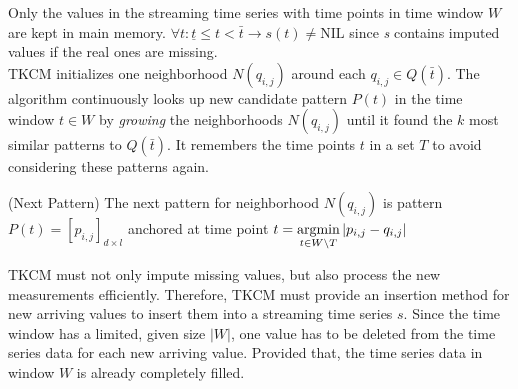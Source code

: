 \documentclass[abstracton,12pt,oneside]{scrreprt}
\begin{document}
Only the values in the streaming time series with time points in time window $W$ are kept in main memory. $\forall t: \underline{t} \leq t < \bar{t} \rightarrow s(t) \ne \text{NIL}$ since \emph{s} contains imputed values if the real ones are missing. \\
TKCM  initializes one neighborhood $N(q_{i,j})$ around each $q_{i,j} \in Q(\bar{t})$. The algorithm continuously looks up new candidate pattern $P(t)$ in the time window $t \in W$ by \emph{growing} the neighborhoods $N(q_{i,j})$ until it found the $k$ most similar patterns to $Q(\bar{t})$. It remembers the time points $t$ in a set $T$ to avoid considering these patterns again. 
\begin{defn}
		\label{def3}
	(Next Pattern) The next pattern for neighborhood $N(q_{i,j})$ is pattern $P(t) = [p_{i,j}]_{d\times l}$ anchored at time point $t = \argmin_{t \in W \setminus T} |p_{i,j}-q_{i,j}|$
\end{defn}
TKCM must not only impute missing values, but also process the new measurements efficiently. Therefore, TKCM must provide an insertion method for new arriving values to insert them into a streaming time series $s$. Since the time window has a limited, given size $|W|$, one value has to be deleted from the time series data for each new arriving value. Provided that, the time series data in window $W$ is already completely filled. 
\end{document}
